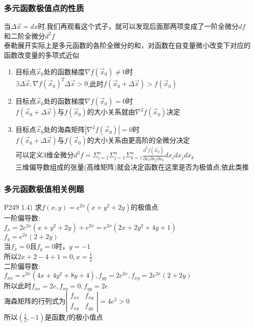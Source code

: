 \documentclass[xetex]{beamer}
\begin{document}
\begin{frame}
	\frametitle{多元函数极值点的性质}
	
	当$\Delta\vec x=dx$时,我们再观看这个式子，就可以发现后面那两项变成了一阶全微分$df$和二阶全微分$d^2f$\\ \pause
	泰勒展开实际上是多元函数的各阶全微分的和，对函数在自变量微小改变下对应的函数改变量的多项式近似\\ \pause
	\begin{enumerate}
		\item 目标点$\vec x_0$处的函数梯度$\nabla f(\vec x_0)\not=0$时\\ 
		$\exists \Delta \vec x,\nabla f(\vec x_0)^T\Delta \vec x>0$,此时$f(\vec x_0+\Delta \vec x)>f(\vec x_0)$\\ \pause
		\item 目标点$\vec x_0$处的函数梯度$\nabla f(\vec x_0)=0$时\\
		$f(\vec x_0+\Delta \vec x)$与$f(\vec x_0)$的大小关系就由$\nabla^2 f(\vec x_0)$决定\\ \pause
		\item 目标点$\vec x_0$处的海森矩阵$|\nabla^2 f(\vec x_0)|=0$时\\
		$f(\vec x_0+\Delta \vec x)$与$f(\vec x_0)$的大小关系由更高阶的全微分决定\\ \pause
		可以定义3维全微分$d^3 f=\Sigma_{i=1}^n\Sigma_{j=1}^n\Sigma_{k=1}^n\frac{\partial^3 f(\vec x_0)}{\partial x_i\partial x_j\partial x_k}dx_idx_jdx_k$\\ \pause
		三维偏导数组成的张量(高维矩阵)就会决定函数在这里是否为极值点,依此类推\\ \pause
		
	\end{enumerate}
\end{frame}

\begin{frame}
	\frametitle{多元函数极值相关例题}
	P249 1.4)
	求$f(x,y)=e^{2x}(x+y^2+2y)$的极值点\\
	一阶偏导数:\\
	$f_x=2e^{2x}(x+y^2+2y)+e^{2x}=e^{2x}(2x+2y^2+4y+1)$\\
	$f_y=e^{2x}(2+2y)$\\
	当$f_x=0$且$f_y=0$时，$y=-1$\\
	所以$2x+2-4+1=0,x=\frac{1}{2}$\\ \pause
	二阶偏导数:\\
	$f_{xx}=e^{2x}(4x+4y^2+8y+4),f_{yy}=2e^{2x},f_{xy}=2e^{2x}(2+2y)$\\
	所以此时$f_{xx}=2e,f_{xy}=0,f_{yy}=2e$\\ \pause
	海森矩阵的行列式为$
	\left|
		\begin{matrix}
			f_{xx}&f_{xy}\\
			f_{xy}&f_{yy}
		\end{matrix}
	\right|
	=4e^2>0$\\
	所以$(\frac{1}{2},-1)$是函数$f$的极小值点
	
	
\end{frame}
\end{document}
